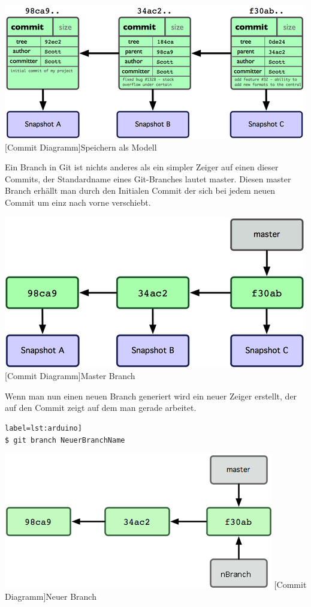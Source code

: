 \documentclass[12pt,a4paper,bibliography=totocnumbered,listof=totocnumbered]{scrartcl}
\begin{document}
\vspace{1em}
\begin{minipage}{\linewidth}
	\centering
	\includegraphics[width=0.6\linewidth]{Bilder/commit.png}
	[Commit Diagramm]{Speichern als Modell\footnotemark }
	\label{fig:gitspeichern}
\end{minipage} 	

Ein Branch in Git ist nichts anderes als ein simpler Zeiger auf einen dieser Commits, der Standardname eines Git-Branches lautet master. Diesen master Branch erhällt man durch den Initialen Commit der sich bei jedem neuen Commit um einz nach vorne verschiebt.
\newline
\vspace{2em}
\begin{minipage}{\linewidth}
	\centering
	\includegraphics[width=0.6\linewidth]{Bilder/master.png}
	[Commit Diagramm]{Master Branch\footnotemark }
	\label{fig:gitspeichern}
\end{minipage} 

Wenn man nun einen neuen Branch generiert wird ein neuer Zeiger erstellt, der auf den Commit zeigt auf dem man gerade arbeitet.

\begin{lstlisting}[caption=Branch Befehl] label=lst:arduino]
$ git branch NeuerBranchName
\end{lstlisting}

\newline

\vspace{2em}
\begin{minipage}{\linewidth}
	\centering
	\includegraphics[width=0.6\linewidth]{Bilder/nbranch.png}
	[Commit Diagramm]{Neuer Branch\footnotemark }
	\label{fig:gitspeichern}
\end{minipage}
\end{document}

